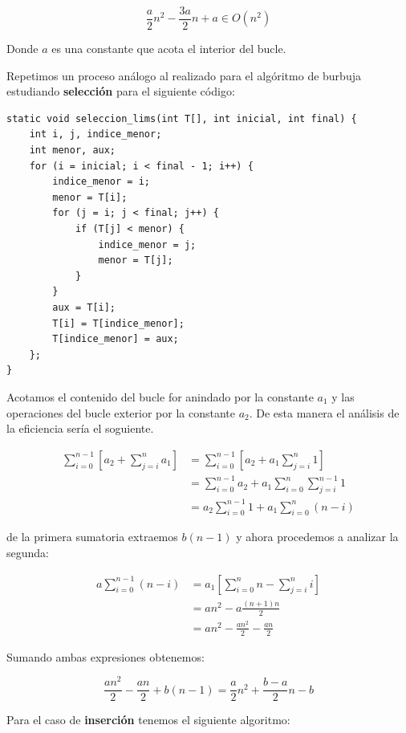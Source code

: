 \documentclass[11pt,a4paper]{article}
\begin{document}
$$\frac{a}{2} n^2 - \frac{3a}{2} n + a \in O(n^2)$$

Donde $a$ es una constante que acota el interior del bucle.

Repetimos un proceso análogo al realizado para el algóritmo de burbuja estudiando \textbf{selección} para el siguiente código:

\newpage

\begin{lstlisting}
static void seleccion_lims(int T[], int inicial, int final) {
	int i, j, indice_menor;
	int menor, aux;
	for (i = inicial; i < final - 1; i++) {
		indice_menor = i;
		menor = T[i];
		for (j = i; j < final; j++) {
			if (T[j] < menor) {
				indice_menor = j;
				menor = T[j];
			}
		}
		aux = T[i];
		T[i] = T[indice_menor];
		T[indice_menor] = aux;
	};
}
\end{lstlisting}

Acotamos el contenido del bucle for anindado por la constante $a_1$ y
las operaciones del bucle exterior por la constante $a_2$.  De esta
manera el análisis de la eficiencia sería el soguiente.

\begin{equation}
  \begin{aligned}
    \sum_{i=0}^{n-1}\left[a_2 + \sum_{j=i}^n{a_1}\right] &= \sum_{i=0}^{n-1}\left[a_2+a_1\sum_{j=i}^{n}1\right]  \\
    &= \sum_{i=0}^{n-1}a_2 + a_1 \sum_{i=0}^{n}\sum_{j=i}^{n-1}1 \\
    &= a_2\sum_{i=0}^{n-1}1 + a_1 \sum_{i=0}^{n}(n-i)
  \end{aligned}
\end{equation}

de la primera sumatoria extraemos $b(n-1)$ y ahora procedemos a analizar la segunda:

\begin{equation}
  \begin{aligned}
    a\sum_{i=0}^{n-1}(n-i) &= a_1\left[\sum_{i=0}^{n}n - \sum_{j=i}^{n}i\right]  \\
    &= an^2 - a \frac{(n+1)n}{2} \\
    &= an^2- \frac{an^2}{2} - \frac{an}{2}
  \end{aligned}
\end{equation}

Sumando ambas expresiones obtenemos:

$$\frac{an^2}{2} - \frac{an}{2}+ b(n-1) = \frac{a}{2}n^2+\frac{b-a}{2}n - b$$


Para el caso de \textbf{inserción} tenemos el siguiente algoritmo:
\end{document}
